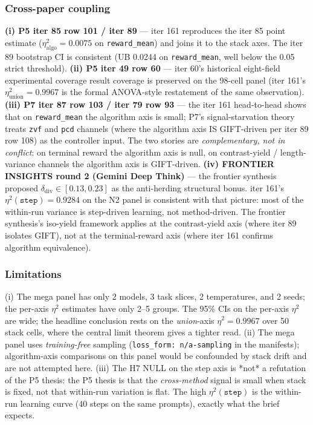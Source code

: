 \documentclass{article}  \usepackage[preprint,nonatbib]{neurips_2026} \usepackage[numbers]{natbib}
\begin{document}
\subsubsection{Cross-paper coupling}
\label{sec:p5-iter161-coupling}
\textbf{(i) P5 iter 85 row 101 / iter 89} --- iter 161 reproduces
the iter 85 point estimate ($\eta^2_{\mathrm{algo}}=0.0075$ on
\texttt{reward\_mean}) and joins it to the stack axes. The iter 89
bootstrap CI is consistent (UB 0.0244 on \texttt{reward\_mean}, well
below the 0.05 strict threshold).
\textbf{(ii) P5 iter 49 row 60} --- iter 60's historical eight-field
experimental coverage result
coverage is preserved on the 98-cell panel (iter 161's
$\eta^2_{\mathrm{union}}=0.9967$ is the formal ANOVA-style restatement
of the same observation).
\textbf{(iii) P7 iter 87 row 103 / iter 79 row 93} --- the iter 161
head-to-head shows that on \texttt{reward\_mean} the algorithm axis
is small; P7's signal-starvation theory treats \texttt{zvf} and
\texttt{pcd} channels (where the algorithm axis IS GIFT-driven per
iter 89 row 108) as the controller input. The two stories are
\emph{complementary, not in conflict}: on terminal reward the
algorithm axis is null, on contrast-yield / length-variance channels
the algorithm axis is GIFT-driven.
\textbf{(iv) FRONTIER INSIGHTS round 2 (Gemini Deep Think)} --- the
frontier synthesis proposed $\delta_{\mathrm{div}} \in [0.13, 0.23]$
as the anti-herding structural bonus. iter 161's $\eta^2(\texttt{step})=0.9284$
on the N2 panel is consistent with that picture: most of the
within-run variance is step-driven learning, not method-driven.
The frontier synthesis's iso-yield framework applies at the
contrast-yield axis (where iter 89 isolates GIFT), not at the
terminal-reward axis (where iter 161 confirms algorithm equivalence).

\subsubsection{Limitations}
\label{sec:p5-iter161-limitations}
(i) The mega panel has only 2 models, 3 task slices, 2 temperatures,
and 2 seeds; the per-axis $\eta^2$ estimates have only 2--5 groups.
The 95\% CIs on the per-axis $\eta^2$ are wide; the headline
conclusion rests on the \emph{union}-axis $\eta^2 = 0.9967$ over 50
stack cells, where the central limit theorem gives a tighter read.
(ii) The mega panel uses \emph{training-free} sampling
(\texttt{loss\_form: n/a-sampling} in the manifests); algorithm-axis
comparisons on this panel would be confounded by stack drift and are
not attempted here. (iii) The H7 NULL on the step axis is *not* a
refutation of the P5 thesis: the P5 thesis is that the \emph{cross-method}
signal is small when stack is fixed, not that within-run variation is
flat. The high $\eta^2(\texttt{step})$ is the within-run learning curve
(40 steps on the same prompts), exactly what the brief expects.
\end{document}
